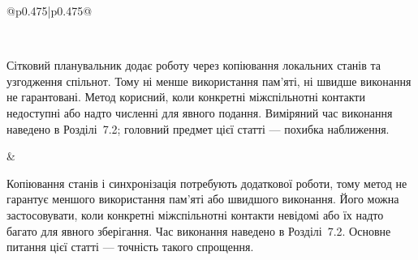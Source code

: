 ﻿\documentclass[11pt]{article}
\begin{document}
\begin{longtable}{@{}p{0.475\textwidth}|p{0.475\textwidth}@{}}
\begin{minipage}[t]{\linewidth}
\end{minipage} \\[5mm]
\begin{minipage}[t]{\linewidth}
Сітковий планувальник додає роботу через копіювання локальних станів та узгодження спільнот. Тому ні менше використання пам'яті, ні швидше виконання не гарантовані. Метод корисний, коли конкретні міжспільнотні контакти недоступні або надто численні для явного подання. Виміряний час виконання наведено в Розділі~7.2; головний предмет цієї статті --- похибка наближення.
\end{minipage} &
\begin{minipage}[t]{\linewidth}
Копіювання станів і синхронізація потребують додаткової роботи, тому метод не гарантує меншого використання пам'яті або швидшого виконання. Його можна застосовувати, коли конкретні міжспільнотні контакти невідомі або їх надто багато для явного зберігання. Час виконання наведено в Розділі~7.2. Основне питання цієї статті --- точність такого спрощення.
\end{minipage} \\[5mm]
\end{longtable}
\clearpage
\end{document}
